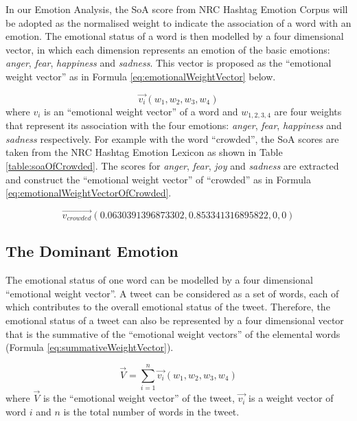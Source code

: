 In our Emotion Analysis, the SoA score from NRC Hashtag Emotion Corpus will be adopted as the normalised weight to indicate the association of a word with an emotion. The emotional status of a word is then modelled by a four dimensional vector, in which each dimension represents an emotion of the basic emotions: \textit{anger}, \textit{fear}, \textit{happiness} and \textit{sadness}. This vector is proposed as the ``emotional weight vector'' as in Formula \ref{eq:emotionalWeightVector} below.

\begin{equation}
\label{eq:emotionalWeightVector}
	\vec{v_i}(w_1, w_2, w_3, w_4)
\end{equation}
where \(v_i\) is an ``emotional weight vector'' of a word and \(w_{1,2,3,4}\) are four weights that represent its association with the four emotions: \textit{anger}, \textit{fear}, \textit{happiness} and \textit{sadness} respectively. For example with the word ``crowded'', the SoA scores are taken from the NRC Hashtag Emotion Lexicon as shown in Table \ref{table:soaOfCrowded}. The scores for \textit{anger}, \textit{fear}, \textit{joy} and \textit{sadness} are extracted and construct the ``emotional weight vector'' of ``crowded'' as in Formula \ref{eq:emotionalWeightVectorOfCrowded}.

\begin{equation}
\label{eq:emotionalWeightVectorOfCrowded}
	\vec{v_{crowded}}(0.0630391396873302, 0.853341316895822, 0, 0)
\end{equation}

\subsection{The Dominant Emotion}
The emotional status of one word can be modelled by a four dimensional ``emotional weight vector''. A tweet can be considered as a set of words, each of which contributes to the overall emotional status of the tweet. Therefore, the emotional status of a tweet can also be represented by a four dimensional vector that is the summative of the ``emotional weight vectors'' of the elemental words (Formula \ref{eq:summativeWeightVector}).

\begin{equation}
\label{eq:summativeWeightVector}
	\vec{V} = \sum\limits_{i=1}^n \vec{v_i}(w_1, w_2, w_3, w_4)
\end{equation}
where \(\vec{V}\) is the ``emotional weight vector'' of the tweet, \(\vec{v_i}\) is a weight vector of word \(i\) and \(n\) is the total number of words in the tweet.


